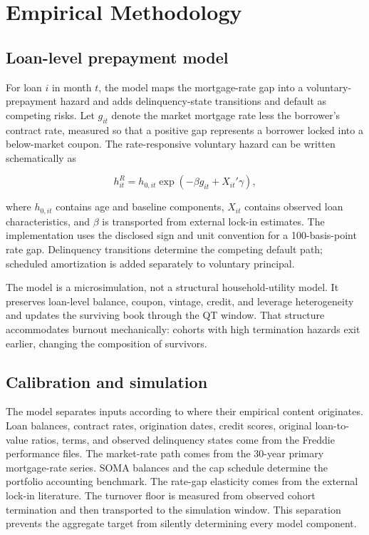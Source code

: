 \section{Empirical Methodology}\label{sec:model}\label{sec:method-estimators}\label{sec:hazard}\label{sec:hazard-motivation}\label{sec:pathb}

\subsection{Loan-level prepayment model}

For loan $i$ in month $t$, the model maps the mortgage-rate gap into a voluntary-prepayment hazard and adds delinquency-state transitions and default as competing risks. Let $g_{it}$ denote the market mortgage rate less the borrower's contract rate, measured so that a positive gap represents a borrower locked into a below-market coupon. The rate-responsive voluntary hazard can be written schematically as

\begin{equation}
h^{R}_{it}=h_{0,it}\exp(-\beta g_{it}+X_{it}'\gamma),
\label{eq:ratehazard}
\end{equation}
\label{eq:beta1}\label{eq:pathB}\label{eq:default}

where $h_{0,it}$ contains age and baseline components, $X_{it}$ contains observed loan characteristics, and $\beta$ is transported from external lock-in estimates. The implementation uses the disclosed sign and unit convention for a 100-basis-point rate gap. Delinquency transitions determine the competing default path; scheduled amortization is added separately to voluntary principal.

The model is a microsimulation, not a structural household-utility model. It preserves loan-level balance, coupon, vintage, credit, and leverage heterogeneity and updates the surviving book through the QT window. That structure accommodates burnout mechanically: cohorts with high termination hazards exit earlier, changing the composition of survivors.

\subsection{Calibration and simulation}

The model separates inputs according to where their empirical content originates. Loan balances, contract rates, origination dates, credit scores, original loan-to-value ratios, terms, and observed delinquency states come from the Freddie performance files. The market-rate path comes from the 30-year primary mortgage-rate series. SOMA balances and the cap schedule determine the portfolio accounting benchmark. The rate-gap elasticity comes from the external lock-in literature. The turnover floor is measured from observed cohort termination and then transported to the simulation window. This separation prevents the aggregate target from silently determining every model component.

